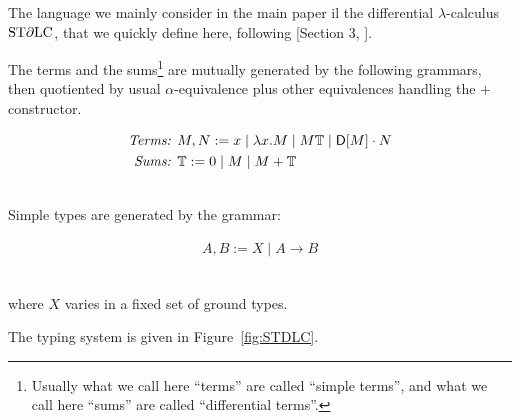 The language we mainly consider in the main paper il the differential $\lambda$-calculus $\mathrm{ST}\partial\mathrm{LC}$, that we quickly define here, following [Section 3, \cite{Manzo2010}].

The terms and the sums\footnote{Usually what we call here ``terms'' are called ``simple terms'', and what we call here ``sums'' are called ``differential terms''.} are mutually generated by the following grammars, then quotiented by usual $\alpha$-equivalence plus other equivalences handling the $+$ constructor.

{
\begin{minipage}{\textwidth}
\begin{align*}
\textit{Terms: } & M,N:= x\mid \lambda x.M \mid M\mathbb{T} \mid \mathsf{D} [M] \cdot N
\\
\textit{Sums: } & \mathbb{T}:= 0 \mid M \mid M+\mathbb{T}
\end{align*}\end{minipage}}\medskip\\
Simple types are generated by the grammar:

{
\begin{minipage}{\textwidth}
\begin{align*}
A,B:= X\mid A\to B
\end{align*}\end{minipage}}\medskip\\
where $X$ varies in a fixed set of ground types.

The typing system is given in Figure~\ref{fig:STDLC}.

